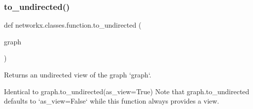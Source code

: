 \subsubsection{\texorpdfstring{to\+\_\+undirected()}{to\_undirected()}}
{\footnotesize\ttfamily def networkx.\+classes.\+function.\+to\+\_\+undirected (\begin{DoxyParamCaption}\item[{}]{graph }\end{DoxyParamCaption})}

\begin{DoxyVerb}Returns an undirected view of the graph `graph`.

Identical to graph.to_undirected(as_view=True)
Note that graph.to_undirected defaults to `as_view=False`
while this function always provides a view.
\end{DoxyVerb}
 
